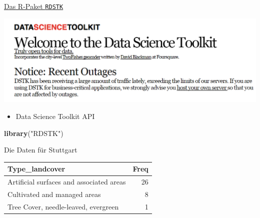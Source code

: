 \documentclass[ignorenonframetext,]{beamer}
\newenvironment{Shaded}{\begin{snugshade}}{\end{snugshade}}
\newcommand{\DecValTok}[1]{\textcolor[rgb]{0.27,0.67,0.26}{#1}}
\newcommand{\KeywordTok}[1]{\textcolor[rgb]{0.26,0.66,0.93}{\textbf{#1}}}
\newcommand{\NormalTok}[1]{\textcolor[rgb]{0.74,0.68,0.62}{#1}}
\newcommand{\OperatorTok}[1]{\textcolor[rgb]{0.74,0.68,0.62}{#1}}
\newcommand{\StringTok}[1]{\textcolor[rgb]{0.02,0.61,0.04}{#1}}
\providecommand{\tightlist}{%
  \setlength{\itemsep}{0pt}\setlength{\parskip}{0pt}}
\begin{document}
\begin{frame}[fragile]{\href{http://www.datasciencetoolkit.org/}{Das
R-Paket \texttt{RDSTK}}}
\protect\hypertarget{das-r-paket-rdstk}{}

\includegraphics{figure/DataScienceToolkit.PNG}

\begin{itemize}
\tightlist
\item
  Data Science Toolkit API
\end{itemize}

\begin{Shaded}
\begin{Highlighting}[]
\KeywordTok{library}\NormalTok{(}\StringTok{"RDSTK"}\NormalTok{)}
\end{Highlighting}
\end{Shaded}

\end{frame}

\begin{frame}[fragile]{Die Daten für Stuttgart}
\protect\hypertarget{die-daten-fur-stuttgart}{}

\begin{Shaded}
\end{Shaded}

\begin{longtable}[]{@{}lr@{}}
\toprule
Type\_landcover & Freq\tabularnewline
\midrule
\endhead
Artificial surfaces and associated areas & 26\tabularnewline
Cultivated and managed areas & 8\tabularnewline
Tree Cover, needle-leaved, evergreen & 1\tabularnewline
\bottomrule
\end{longtable}

\end{frame}
\end{document}
